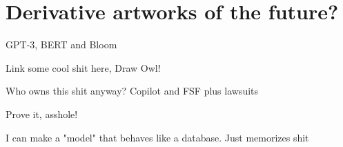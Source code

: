 \setchapterpreamble[u]{\margintoc}
\chapter{Derivative artworks of the future?}

GPT-3, BERT and Bloom

Link some cool shit here, Draw Owl!

Who owns this shit anyway? Copilot and FSF plus lawsuits

Prove it, asshole!

I can make a "model" that behaves like a database. Just memorizes shit
